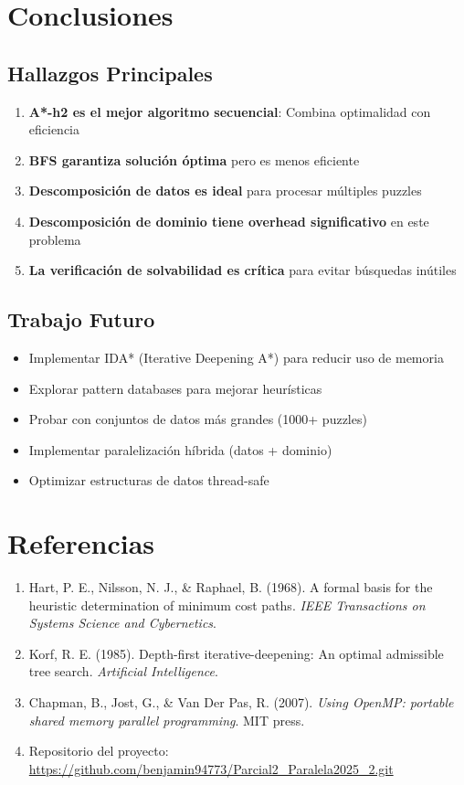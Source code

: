 \documentclass[12pt,a4paper]{article}
\begin{document}
\section{Conclusiones}

\subsection{Hallazgos Principales}

\begin{enumerate}
    \item \textbf{A*-h2 es el mejor algoritmo secuencial}: Combina optimalidad con eficiencia
    \item \textbf{BFS garantiza solución óptima} pero es menos eficiente
    \item \textbf{Descomposición de datos es ideal} para procesar múltiples puzzles
    \item \textbf{Descomposición de dominio tiene overhead significativo} en este problema
    \item \textbf{La verificación de solvabilidad es crítica} para evitar búsquedas inútiles
\end{enumerate}

\subsection{Trabajo Futuro}

\begin{itemize}
    \item Implementar IDA* (Iterative Deepening A*) para reducir uso de memoria
    \item Explorar pattern databases para mejorar heurísticas
    \item Probar con conjuntos de datos más grandes (1000+ puzzles)
    \item Implementar paralelización híbrida (datos + dominio)
    \item Optimizar estructuras de datos thread-safe
\end{itemize}

\section{Referencias}

\begin{enumerate}
    \item Hart, P. E., Nilsson, N. J., \& Raphael, B. (1968). A formal basis for the heuristic determination of minimum cost paths. \textit{IEEE Transactions on Systems Science and Cybernetics}.
    
    \item Korf, R. E. (1985). Depth-first iterative-deepening: An optimal admissible tree search. \textit{Artificial Intelligence}.
    
    \item Chapman, B., Jost, G., \& Van Der Pas, R. (2007). \textit{Using OpenMP: portable shared memory parallel programming}. MIT press.
    
    \item Repositorio del proyecto: \url{https://github.com/benjamin94773/Parcial2_Paralela2025_2.git}
\end{enumerate}
\end{document}
